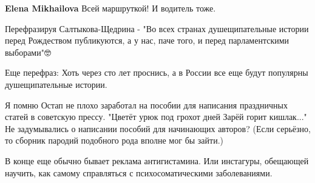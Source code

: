 \begin{itemize}
\begin{itemize}
 
\textbf{Elena Mikhailova} Всей маршруткой! И водитель тоже.
\end{itemize}

 

Перефразируя Салтыкова-Щедрина - "Во всех странах душещипательные истории перед
Рождеством публикуются, а у нас, паче того, и перед парламентскими выборами"🤓

\begin{itemize}
 
Еще перефраз:
Хоть через сто лет проснись, а в России все еще будут популярны душещипательные истории.
\end{itemize}

 
Я помню Остап не плохо заработал на пособии для написания праздничных статей в советскую прессу.
"Цветёт урюк под грохот дней
Зарёй горит кишлак..."
Не задумывались о написании пособий для начинающих авторов?
(Если серьёзно, то сборник пародий подобного рода вполне мог бы зайти.)

 

В конце еще обычно бывает реклама антигистамина. Или инстагуры, обещающей
научить, как самому справляться с психосоматическими заболеваниями.


\end{itemize}
